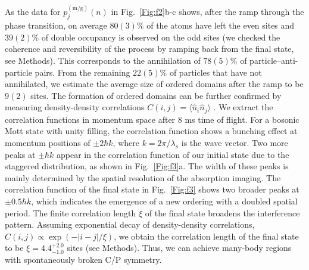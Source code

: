 \documentclass[aps,prl,twocolumn,superscriptaddress,footinbib,linenumbers]{revtex4}
\begin{document}
As the data for $p_j^{(\mathrm{m}/\mathrm{g})}(n)$ in Fig.~\ref{Fig:f2}b-c shows, after the ramp through the phase transition, on average $80(3)\%$ of the atoms have left the even sites and $39(2)\%$ of double occupancy is observed on the odd sites (we checked the coherence and reversibility of the process by ramping back from the final state, see Methods). This corresponds to the annihilation of $78(5)\%$ of particle--anti-particle pairs. From the remaining $22(5)\%$ of particles that have not annihilated, we estimate the average size of ordered domains after the ramp to be $9(2)$ sites. The formation of ordered domains can be further confirmed by measuring density-density correlations $C(i,j)=\langle \hat{n}_i \hat{n}_{j} \rangle$ \cite{Altman:2004,Folling:2005,Simon:2011}. We extract the correlation functions in momentum space after $8$ ms time of flight. For a bosonic Mott state with unity filling, the correlation function shows a bunching effect at momentum positions of $\pm 2\hbar k$, where $k=2\pi/\lambda_s$ is the wave vector. Two more peaks at $\pm \hbar k$ appear in the correlation function of our initial state due to the staggered distribution, as shown in Fig.~\ref{Fig:f3}a. The width of these peaks is mainly determined by the spatial resolution of the absorption imaging. The correlation function of the final state in Fig.~\ref{Fig:f3} shows two broader peaks at $\pm 0.5 \hbar k$, which indicates the emergence of a new ordering with a doubled spatial period. The finite correlation length $\xi$ of the final state broadens the interference pattern. Assuming exponential decay of density-density correlations, $C(i,j) \propto \exp(-|i-j|/\xi)$, we obtain the correlation length of the final state to be $\xi = 4.4^{+2.0}_{-1.0}$ sites (see Methods). Thus, we can achieve many-body regions with spontaneously broken C/P symmetry.
\end{document}
